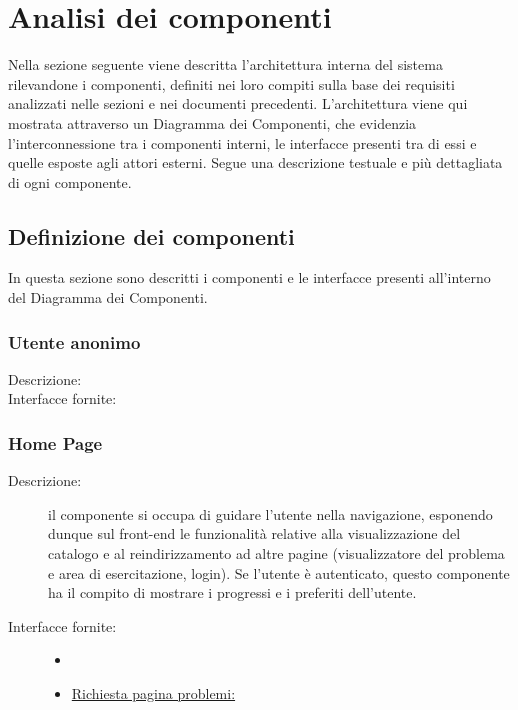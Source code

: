 \documentclass[11pt, a4paper]{article}
\theoremstyle{definition} %
\begin{document}
\newpage
\section{Analisi dei componenti}



Nella sezione seguente viene descritta l'architettura interna del sistema
rilevandone i componenti, definiti nei loro compiti sulla base dei requisiti
analizzati nelle sezioni e nei documenti precedenti. L'architettura viene
qui mostrata attraverso un Diagramma dei Componenti, che evidenzia
l'interconnessione tra i componenti interni, le interfacce presenti tra di
essi e quelle esposte agli attori esterni. Segue una descrizione testuale
e più dettagliata di ogni componente.


\subsection{Definizione dei componenti}
In questa sezione sono descritti i componenti e le interfacce presenti
all'interno del Diagramma dei Componenti.

\subsubsection{Utente anonimo}
\begin{description}
    \item[Descrizione:]
    \item[Interfacce fornite:]
\end{description}

\subsubsection{Home Page}
\begin{description}
    \item[Descrizione:] il componente si occupa di guidare l'utente nella
    navigazione, esponendo dunque sul front-end le funzionalità relative
    alla visualizzazione del catalogo e al reindirizzamento ad altre pagine
    (visualizzatore del problema e area di esercitazione, login). Se l'utente
    è autenticato, questo componente ha il compito di mostrare i progressi e
    i preferiti dell'utente.
    \item[Interfacce fornite:]
    \begin{itemize}
        \item[]
        \item \underline{Richiesta pagina problemi:}
    \end{itemize}
\end{description}
\end{document}

